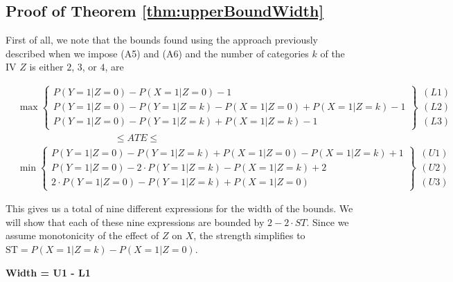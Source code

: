 \documentclass[
]{article}
\theoremstyle{plain}
\begin{document}
\hypertarget{proof-of-theorem}{%
\subsection{\texorpdfstring{Proof of Theorem \ref{thm:upperBoundWidth}}{Proof of Theorem }}\label{proof-of-theorem}}

First of all, we note that the bounds found using the approach previously described when we impose (A5) and (A6) and the number of categories \(k\) of the IV \(Z\) is either \(2\), \(3\), or \(4\), are

\[
  \begin{aligned}
    &\max
      \begin{Bmatrix}
        P(Y = 1 | Z = 0) - P(X = 1 | Z = 0) - 1 \\
        P(Y = 1 | Z = 0) - P(Y = 1 | Z = k) - P(X = 1 | Z = 0) + P(X = 1 | Z = k) - 1 \\
        P(Y = 1 | Z = 0) - P(Y = 1 | Z = k) + P(X = 1 | Z = k) - 1
      \end{Bmatrix} 
      \begin{matrix} (L1) \\ (L2) \\ (L3) \end{matrix}  \\
    &\qquad \qquad \qquad \qquad \qquad\le ATE \le \\
    &\min
      \begin{Bmatrix}
        P(Y = 1 | Z = 0) - P(Y = 1 | Z = k) + P(X = 1 | Z = 0) - P(X = 1 | Z = k) + 1\\
        P(Y = 1 | Z = 0) - 2\cdot P(Y = 1 | Z = k) - P(X = 1 | Z = k) + 2 \\
        2\cdot P(Y = 1 | Z = 0) - P(Y = 1 | Z = k) + P(X = 1 | Z = 0)
      \end{Bmatrix}
      \begin{matrix} (U1) \\ (U2) \\ (U3) \end{matrix}
  \end{aligned}
\]

This gives us a total of nine different expressions for the width of the bounds. We will show that each of these nine expressions are bounded by \(2 - 2\cdot ST\). Since we assume monotonicity of the effect of \(Z\) on \(X\), the strength simplifies to \(\text{ST} = P(X = 1 | Z = k) - P(X = 1 | Z = 0)\).

\textbf{Width = U1 - L1}
\end{document}
